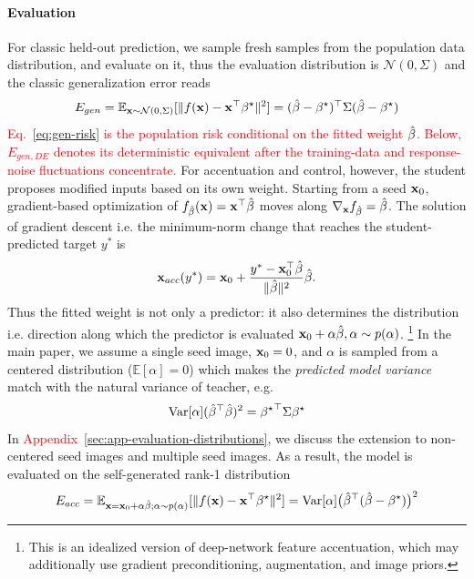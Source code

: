 \documentclass{article}
\newcommand{\red}[1]{\textcolor{red}{#1}}
\theoremstyle{plain}
\theoremstyle{definition}
\theoremstyle{remark}
\begin{document}
\paragraph{Evaluation}
For classic held-out prediction, we sample fresh samples from the population data distribution, and evaluate on it, thus the evaluation distribution is $\mathcal{N}(0,\Sigma)$ and the classic generalization error reads %
\begin{equation}
    E_{gen}=\mathbb{E}_{\mathbf{x}\sim \mathcal{N}(0,\Sigma)}[\|f(\mathbf{x})-\mathbf{x}^\top{\beta^{\star}}\|^2]=(\hat{\beta}-{\beta^{\star}})^\top\Sigma(\hat{\beta}-{\beta^{\star}})
    \label{eq:gen-risk}
\end{equation}
\red{Eq.~\ref{eq:gen-risk} is the population risk conditional on the fitted weight $\hat{\beta}$. Below, $E_{gen,DE}$ denotes its deterministic equivalent after the training-data and response-noise fluctuations concentrate.}
For accentuation and control, however, the student proposes modified inputs based on its own weight.
Starting from a seed $\mathbf{x}_0$, gradient-based optimization of $f_{\hat{\beta}}(\mathbf{x})=\mathbf{x}^\top\hat{\beta}$ moves along $\nabla_{\mathbf{x}}f_{\hat{\beta}}=\hat{\beta}$.
The solution of gradient descent i.e. the minimum-norm change that reaches the student-predicted target $y^*$ is
\begin{equation}
    \mathbf{x}_{acc}(y^*)
    =\mathbf{x}_0+\frac{y^*-\mathbf{x}_0^\top\hat{\beta}}{\|\hat{\beta}\|^2}\hat{\beta}.
    \label{eq:linear-accentuation-path}
\end{equation}
Thus the fitted weight is not only a predictor: it also determines the distribution i.e. direction along which the predictor is evaluated $\mathbf{x}_{0}+\alpha\hat{\beta},\alpha\sim p(\alpha)$.
\footnote{This is an idealized version of deep-network feature accentuation, which may additionally use gradient preconditioning, augmentation, and image priors.\cite{hamblin2024feature,Fel_maco} }
In the main paper, we assume a single seed image, $\mathbf{x}_{0}=0$,
and $\alpha$ is sampled from a centered distribution ($\mathbb{E}[\alpha]=0$) which makes the \emph{predicted model variance} match with the natural variance of teacher, e.g.
\begin{equation}
\mathrm{Var}[\alpha]({\hat{\beta}}^{\top}\hat{\beta})^2={{\beta^{\star}}}^{\top}\Sigma{\beta^{\star}}
\label{eq:variance-matching}
\end{equation}
In \red{Appendix~\ref{sec:app-evaluation-distributions}}, we discuss the extension to non-centered seed images and multiple seed images.
As a result, the model is evaluated on the self-generated rank-1 distribution
\begin{equation}
    E_{acc}=\mathbb{E}_{\mathbf{x}=\mathbf{x}_{0}+\alpha\hat{\beta};\alpha\sim p(\alpha)}[\|f(\mathbf{x})-\mathbf{x}^\top{\beta^{\star}}\|^2]=\mathrm{Var}[\alpha]\big({\hat{\beta}}^{\top}(\hat{\beta}-{\beta^{\star}})\big)^{2}
    \label{eq:accentuation-path-error}
\end{equation}
\end{document}
